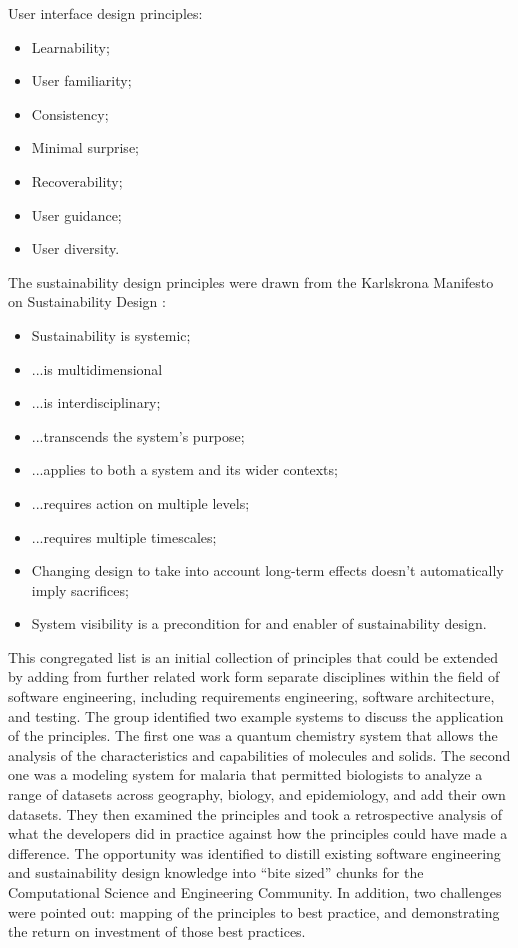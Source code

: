 User interface design principles:
\begin{itemize}
\item Learnability;
\item User familiarity;
\item Consistency;
\item Minimal surprise;
\item Recoverability;
\item User guidance;
\item User diversity.
\end{itemize}

The sustainability design principles were drawn from the Karlskrona Manifesto on Sustainability Design :
\begin{itemize}
\item Sustainability is systemic;
\item ...is multidimensional
\item ...is interdisciplinary;
\item ...transcends the system's purpose;
\item ...applies to both a system and its wider contexts;
\item ...requires action on multiple levels;
\item ...requires multiple timescales;
\item Changing design to take into account long-term effects doesn't automatically imply sacrifices;
\item System visibility is a precondition for and enabler of sustainability design.
\end{itemize}

This congregated list is an initial collection of principles that could be extended by adding from further 
related work form separate disciplines within the field of software engineering, including requirements 
engineering, software architecture, and testing. The group identified two example systems to discuss 
the application of the principles. The first one was a quantum chemistry system that allows the analysis 
of the characteristics and capabilities of molecules and solids. The second one was a modeling system 
for malaria that permitted biologists to analyze a range of datasets across geography, biology, and 
epidemiology, and add their own datasets. They then examined the principles and took a retrospective 
analysis of what the developers did in practice against how the principles could have made a 
difference. The opportunity was identified to distill existing software engineering and sustainability 
design knowledge into ``bite sized'' chunks for the Computational Science and Engineering 
Community. In addition, two challenges were pointed out: mapping of the principles to best practice, 
and  demonstrating the return on investment of those best practices.


